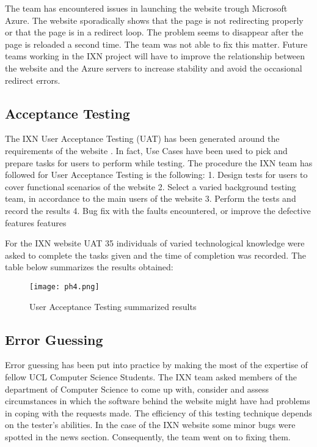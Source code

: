 \documentclass[fontsize=10pt]{extarticle}
\numberwithin{figure}{section} %
\begin{document}
The team has encountered issues in launching the website trough
Microsoft Azure. The website sporadically shows that the page is not
redirecting properly or that the page is in a redirect loop. The problem
seems to disappear after the page is reloaded a second time. The team
was not able to fix this matter. Future teams working in the IXN project
will have to improve the relationship between the website and the Azure
servers to increase stability and avoid the occasional redirect errors.

\hypertarget{acceptance-testing}{%
\subsection{Acceptance Testing}\label{acceptance-testing}}

The IXN User Acceptance Testing (UAT) has been generated around the
requirements of the website \cite{g7} . In fact, Use Cases have been
used to pick and prepare tasks for users to perform while testing. The
procedure the IXN team has followed for User Acceptance Testing is the
following: 1. Design tests for users to cover functional scenarios of
the website 2. Select a varied background testing team, in accordance to
the main users of the website 3. Perform the tests and record the
results 4. Bug fix with the faults encountered, or improve the defective
features features

For the IXN website UAT 35 individuals of varied technological knowledge
were asked to complete the tasks given and the time of completion was
recorded. The table below summarizes the results obtained:

\begin{figure}[H]
      \centering
      \texttt{[image: ph4.png]}
      \caption{User Acceptance Testing summarized results}
 \end{figure}

\hypertarget{error-guessing}{%
\subsection{Error Guessing}\label{error-guessing}}

Error guessing has been put into practice by making the most of the
expertise of fellow UCL Computer Science Students. The IXN team asked
members of the department of Computer Science to come up with, consider
and assess circumstances in which the software behind the website might
have had problems in coping with the requests made. The efficiency of
this testing technique depends on the tester's abilities. In the case of
the IXN website some minor bugs were spotted in the news section.
Consequently, the team went on to fixing them.
\end{document}
